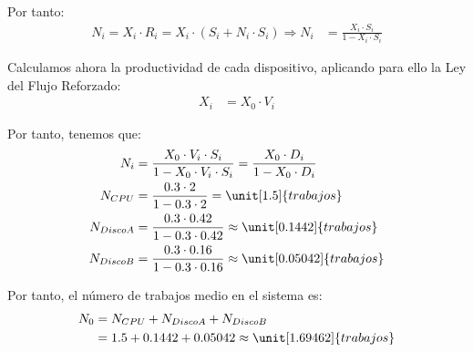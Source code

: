 \documentclass[12pt]{article}
\begin{document}
\begin{ejercicio}[2 puntos]
\begin{enumerate}
            Por tanto:
            \begin{align*}
                N_i = X_i\cdot R_i
                = X_i\cdot (S_i + N_i\cdot S_i)
                \Longrightarrow N_i &= \frac{X_i\cdot S_i}{1 - X_i\cdot S_i}
            \end{align*}

            Calculamos ahora la productividad de cada dispositivo, aplicando para ello la Ley del Flujo Reforzado:
            \begin{align*}
                X_i &= X_0\cdot V_i
            \end{align*}

            Por tanto, tenemos que:
            \begin{align*}
                N_{i} &= \frac{X_0\cdot V_i\cdot S_i}{1 - X_0\cdot V_i\cdot S_i} = \frac{X_0\cdot D_i}{1 - X_0\cdot D_i}\\
                N_{CPU} &= \frac{0.3\cdot 2}{1 - 0.3\cdot 2} = \unit[1.5]{trabajos}\\
                N_{Disco A} &= \frac{0.3\cdot 0.42}{1 - 0.3\cdot 0.42} \approx \unit[0.1442]{trabajos}\\
                N_{Disco B} &= \frac{0.3\cdot 0.16}{1 - 0.3\cdot 0.16} \approx \unit[0.05042]{trabajos}
            \end{align*}

            Por tanto, el número de trabajos medio en el sistema es:
            \begin{align*}
                N_0 &= N_{CPU} + N_{Disco A} + N_{Disco B}\\
                &= 1.5 + 0.1442 + 0.05042 \approx \unit[1.69462]{trabajos}
            \end{align*}
        \end{enumerate}
    \end{ejercicio}
\end{document}
